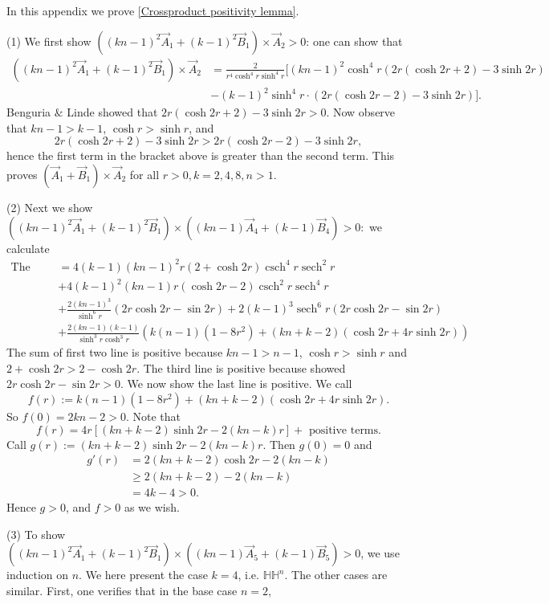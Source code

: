 \documentclass{amsart}
\numberwithin{equation}{section}
\theoremstyle{plain}
\theoremstyle{definition}
\theoremstyle{remark}
\def\HH {\mathbb{H}}
\DeclareMathOperator{\sech}{sech}
\begin{document}
In this appendix we prove \cref{Crossproduct positivity lemma}.
\par (1) We first show $((kn-1)^2\vec A_1+(k-1)^2\vec B_1)\times \vec A_2>0$: one can show that
\begin{align*}
    ((kn-1)^2\vec A_1+(k-1)^2\vec B_1)\times \vec A_2  &=\frac{2}{r^4 \cosh ^4 r \sinh ^4 r}[(k n-1)^2 \cosh ^4 r(2 r(\cosh 2 r+2)-3 \sinh 2 r)\\
    &-(k-1)^2 \sinh ^4 r \cdot(2 r(\cosh 2 r-2)-3\sinh{2r})].
\end{align*}
Benguria $\&$ Linde showed that $2r(\cosh 2 r+2)-3 \sinh 2 r>0$. Now observe that $kn-1>k-1$, $\cosh{r}>\sinh{r}$, and
\[2r(\cosh 2 r+2)-3 \sinh 2 r>2 r(\cosh 2 r-2)-3\sinh{2r},\]
hence the first term in the bracket above is greater than the second term. This proves  $(\vec A_1+\vec B_1)\times \vec A_2 $ for all $r>0, k=2,4,8,n>1.$
\par (2) Next we show $((kn-1)^2\vec A_1+(k-1)^2\vec B_1)\times ((kn-1)\vec A_4+(k-1)\vec B_4) >0:$ we calculate
\begin{align*}
    \text{The above cross product} &= 4(k-1)(k n-1)^2 r(2+\cosh 2 r) \operatorname{csch}^4 r \sech^2 r \\
    &+4(k-1)^2(k n-1) r(\cosh 2 r-2) \operatorname{csch}^2 r \operatorname{sech}^4 r \\
    &+\frac{2(k n-1)^3}{\sinh^6 r}  (2 r \cosh 2 r-\sin 2 r)+2(k-1)^3 \operatorname{sech}^6 r (2 r \cosh 2 r-\sin 2 r)\\
    &+\frac{2(k n-1)(k-1)}{\operatorname{sinh}^3 r \operatorname{cosh}^3 r } \left(k(n-1)\left(1-8 r^2\right)+(k n+k-2)\left(\cosh 2 r+4 r \sinh 2 r\right)\right)
\end{align*}
The sum of first two line is positive because $kn-1>n-1$, $\cosh r>\sinh{r}$ and $2+\cosh{2r}>2-\cosh{2r}$. The third line is positive because \cite{benguria2007second} showed $ 2 r \cosh 2 r-\sin 2 r>0$. We now show the last line is positive. We call \[f(r):=k(n-1)\left(1-8 r^2\right)+(k n+k-2)\left(\cosh 2 r+4 r \sinh 2 r\right).\] So $f(0)=2kn-2>0.$
Note that 
\[f(r)= 4r[(k n+k-2) \sinh{2r}-2(k n-k) r] +\text{ positive terms}.\]
Call $g(r):=(k n+k-2) \sinh{2r}-2(k n-k) r.$ Then $g(0)= 0$ and
\begin{align*}
    g'(r)&= 2(kn+k-2)\cosh{2r}-2(k n-k)\\
     &\geq 2(kn+k-2)-2(k n-k) \\
     &= 4k-4 >0.
\end{align*}
Hence $g>0$, and $f>0$ as we wish.
\par (3) To show $((kn-1)^2\vec A_1+(k-1)^2\vec B_1)\times ((kn-1)\vec A_5+(k-1)\vec B_5)>0$, we use induction on $n$. We here present the case $k=4$, i.e. $\HH\HH^n$. The other cases are similar. First, one verifies that in the base case $n=2$, 
\end{document}
